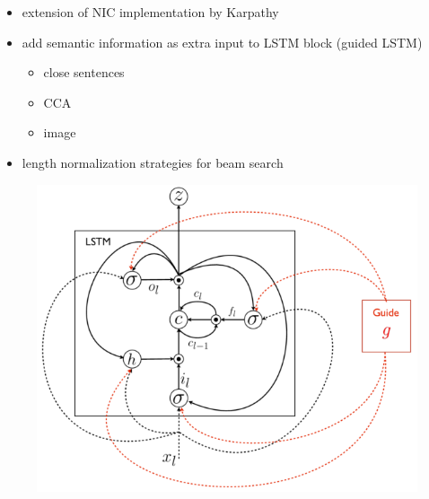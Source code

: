\documentclass[16pt]{beamer}
\begin{document}
\begin{frame}{\cite{Fernando2015}}
\begin{itemize}
\item extension of NIC implementation by Karpathy
\item add semantic information as extra input to LSTM block (guided LSTM)
\begin{itemize}
    \item close sentences
    \item CCA
    \item image
\end{itemize}
\item length normalization strategies for beam search
\end{itemize}
\begin{figure}[tb]
           \centering
           \includegraphics[scale=0.43]{jia.PNG}
\end{figure} %

\end{frame}



\end{document}

